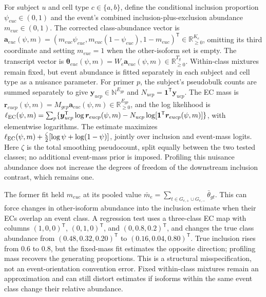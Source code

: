 \documentclass[11pt]{article}
\begin{document}
For subject \(u\) and cell type \(c\in\{a,b\}\), define the conditional inclusion proportion \(\psi_{euc}\in(0,1)\) and the event's combined inclusion-plus-exclusion abundance \(m_{euc}\in(0,1)\). The corrected class-abundance vector is \(\bm a_{euc}(\psi,m)=(m_{euc}\psi_{euc},m_{euc}(1-\psi_{euc}),1-m_{euc})^{\mathsf T}\in\mathbb R_{\ge0}^{K_e}\), omitting its third coordinate and setting \(m_{euc}=1\) when the other-isoform set is empty. The transcript vector is \(\bm\theta_{euc}(\psi,m)=W_e\bm a_{euc}(\psi,m)\in\mathbb R_{\ge0}^{T_g}\). Within-class mixtures remain fixed, but event abundance is fitted separately in each subject and cell type as a nuisance parameter. For primer \(p\), the subject's pseudobulk counts are summed separately to give \(\bm y_{ucp}\in\mathbb N^{E_{gp}}\) and \(N_{ucp}=\bm 1^{\mathsf T}\bm y_{ucp}\). The EC mass is \(\bm r_{eucp}(\psi,m)=M_{gep}\bm a_{euc}(\psi,m)\in\mathbb R_{\ge0}^{E_{gp}}\), and the log likelihood is \(\ell_{\rm EC}(\psi,m)=\sum_p\{\bm y_{ucp}^{\mathsf T}\log\bm r_{eucp}(\psi,m)-N_{ucp}\log[\bm 1^{\mathsf T}\bm r_{eucp}(\psi,m)]\}\), with elementwise logarithms. The estimate maximizes \(\ell_{\rm EC}(\psi,m)+\frac{\zeta}{2}[\log\psi+\log(1-\psi)]\), jointly over inclusion and event-mass logits. Here \(\zeta\) is the total smoothing pseudocount, split equally between the two tested classes; no additional event-mass prior is imposed. Profiling this nuisance abundance does not increase the degrees of freedom of the downstream inclusion contrast, which remains one.

The former fit held \(m_{euc}\) at its pooled value \(\bar m_e=\sum_{t\in G_{e,+}\cup G_{e,-}}\bar\theta_{gt}\). This can force changes in other-isoform abundance into the inclusion estimate when their ECs overlap an event class. A regression test uses a three-class EC map with columns \((1,0,0)^{\mathsf T}\), \((0,1,0)^{\mathsf T}\), and \((0,0.8,0.2)^{\mathsf T}\), and changes the true class abundance from \((0.48,0.32,0.20)^{\mathsf T}\) to \((0.16,0.04,0.80)^{\mathsf T}\). True inclusion rises from 0.6 to 0.8, but the fixed-mass fit estimates the opposite direction; profiling mass recovers the generating proportions. This is a structural misspecification, not an event-orientation convention error. Fixed within-class mixtures remain an approximation and can still distort estimates if isoforms within the same event class change their relative abundance.
\end{document}
